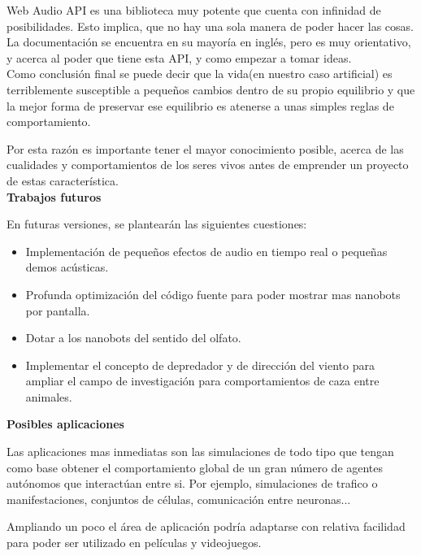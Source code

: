 Web Audio API es una biblioteca muy potente que cuenta con infinidad de posibilidades. Esto
implica, que no hay una sola manera de poder hacer las cosas. La documentación se encuentra
en su mayoría en inglés, pero es muy orientativo, y acerca al poder que tiene esta API, y 
como empezar a tomar ideas.\\

Como conclusión final se puede decir que la vida(en nuestro caso artificial) es terriblemente susceptible a pequeños cambios dentro de su propio equilibrio y que la mejor forma de preservar ese equilibrio es atenerse a unas simples reglas de comportamiento.

Por esta razón es importante tener el mayor conocimiento posible, acerca de las cualidades y comportamientos de los seres vivos antes de emprender un proyecto de estas característica.\\


\noindent\textbf{Trabajos futuros}

En futuras versiones, se
 plantearán las siguientes cuestiones:
\begin{itemize}
 \item Implementación de pequeños efectos de audio en tiempo real o pequeñas demos acústicas.
 \item Profunda optimización del código fuente para poder mostrar mas nanobots por pantalla.
 \item Dotar a los nanobots del sentido del olfato.
 \item Implementar el concepto de depredador y de dirección del viento para ampliar el campo de investigación para comportamientos de caza entre animales. 
\end{itemize}



\noindent\textbf{Posibles aplicaciones}

Las aplicaciones mas inmediatas son las simulaciones de todo tipo que tengan como base obtener el comportamiento global de un gran número de agentes autónomos que interactúan entre si. Por ejemplo, simulaciones de trafico o manifestaciones, conjuntos de células, comunicación entre neuronas...

Ampliando un poco el área de aplicación podría adaptarse con relativa facilidad para poder ser utilizado en películas y videojuegos. 

